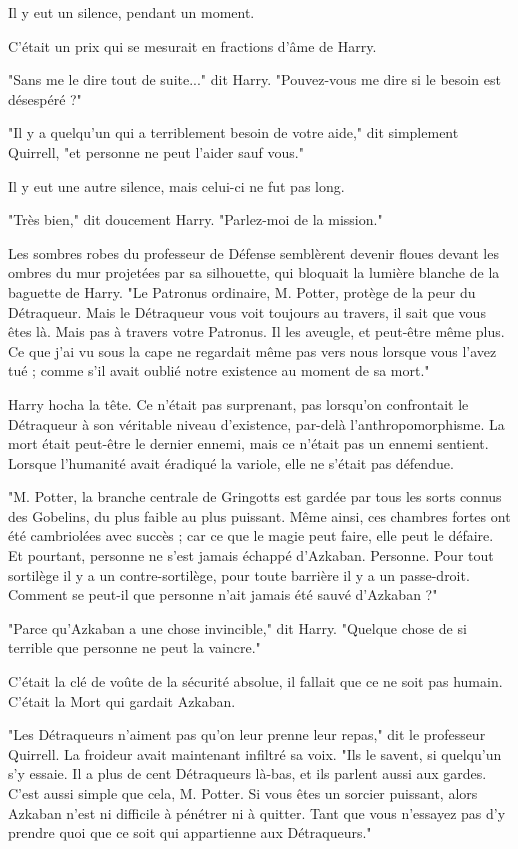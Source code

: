 Il y eut un silence, pendant un moment.

C'était un prix qui se mesurait en fractions d'âme de Harry.

"Sans me le dire tout de suite..." dit Harry. "Pouvez-vous me dire si le besoin est désespéré ?"

"Il y a quelqu'un qui a terriblement besoin de votre aide," dit simplement Quirrell, "et personne ne peut l'aider sauf vous."

Il y eut une autre silence, mais celui-ci ne fut pas long.

"Très bien," dit doucement Harry. "Parlez-moi de la mission."

Les sombres robes du professeur de Défense semblèrent devenir floues devant les ombres du mur projetées par sa silhouette, qui bloquait la lumière blanche de la baguette de Harry. "Le Patronus ordinaire, M. Potter, protège de la peur du Détraqueur. Mais le Détraqueur vous voit toujours au travers, il sait que vous êtes là. Mais pas à travers votre Patronus. Il les aveugle, et peut-être même plus. Ce que j'ai vu sous la cape ne regardait même pas vers nous lorsque vous l'avez tué ; comme s'il avait oublié notre existence au moment de sa mort."

Harry hocha la tête. Ce n'était pas surprenant, pas lorsqu'on confrontait le Détraqueur à son véritable niveau d'existence, par-delà l'anthropomorphisme. La mort était peut-être le dernier ennemi, mais ce n'était pas un ennemi sentient. Lorsque l'humanité avait éradiqué la variole, elle ne s'était pas défendue.

"M. Potter, la branche centrale de Gringotts est gardée par tous les sorts connus des Gobelins, du plus faible au plus puissant. Même ainsi, ces chambres fortes ont été cambriolées avec succès ; car ce que le magie peut faire, elle peut le défaire. Et pourtant, personne ne s'est jamais échappé d'Azkaban. Personne. Pour tout sortilège il y a un contre-sortilège, pour toute barrière il y a un passe-droit. Comment se peut-il que personne n'ait jamais été sauvé d'Azkaban ?"

"Parce qu'Azkaban a une chose invincible," dit Harry. "Quelque chose de si terrible que personne ne peut la vaincre."

C'était la clé de voûte de la sécurité absolue, il fallait que ce ne soit pas humain. C'était la Mort qui gardait Azkaban.

"Les Détraqueurs n'aiment pas qu'on leur prenne leur repas," dit le professeur Quirrell. La froideur avait maintenant infiltré sa voix. "Ils le savent, si quelqu'un s'y essaie. Il a plus de cent Détraqueurs là-bas, et ils parlent aussi aux gardes. C'est aussi simple que cela, M. Potter. Si vous êtes un sorcier puissant, alors Azkaban n'est ni difficile à pénétrer ni à quitter. Tant que vous n'essayez pas d'y prendre quoi que ce soit qui appartienne aux Détraqueurs."

